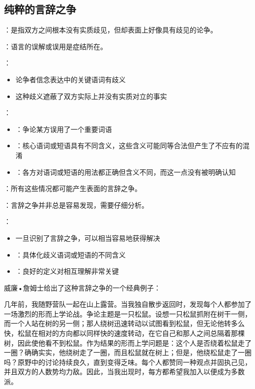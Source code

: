 \subsection{纯粹的言辞之争}

\begin{theorembox}[title=纯粹言辞之争的定义与特征]
：是指双方之间根本没有实质歧见，但却表面上好像具有歧见的论争。

：语言的误解或误用是症结所在。

：
\begin{itemize}
  \item 论争者信念表达中的关键语词有歧义
  \item 这种歧义遮蔽了双方实际上并没有实质对立的事实
\end{itemize}
\end{theorembox}

\begin{theorembox}[title=言辞之争的具体成因]
：
\begin{itemize}
  \item {}：争论某方误用了一个重要词语
  \item {}：核心语词或短语具有不同含义，这些含义可能同等合法但产生了不应有的混淆
  \item {}：各方对语词或短语的用法都正确但含义不同，而这一点没有被明确认知
\end{itemize}

：所有这些情况都可能产生表面的言辞之争。
\end{theorembox}

\begin{theorembox}[title=言辞之争的识别与解决]
：言辞之争并非总是容易发现，需要仔细分析。

：
\begin{itemize}
  \item 一旦识别了言辞之争，可以相当容易地获得解决
  \item {}：具体化歧义语词或短语的不同含义
  \item {}：良好的定义对相互理解非常关键
\end{itemize}
\end{theorembox}

威廉•詹姆士给出了这种言辞之争的一个经典例子：

\begin{displayquote}
几年前，我随野营队一起在山上露营。当我独自散步返回时，发现每个人都参加了一场激烈的形而上学论战。争论主题是一只松鼠。设想一只松鼠抓附在树干一侧，而一个人站在树的另一侧；那人绕树迅速转动以试图看到松鼠，但无论他转多么快，松鼠在相对的方向都以同样快的速度转动，在它自己和那人之间总隔着那棵树，因此使他看不到松鼠。作为结果的形而上学问题是：这个人是否绕着松鼠走了一圈？确确实实，他绕树走了一圈，而且松鼠就在树上；但是，他绕松鼠走了一圈吗？原野中的讨论持续良久，直到变得乏味。每个人都赞同一种观点并固执己见，并且双方的人数势均力敌。因此，当我出现时，每方都希望我加入以便成为多数派。\cite{james1907}
\end{displayquote}

